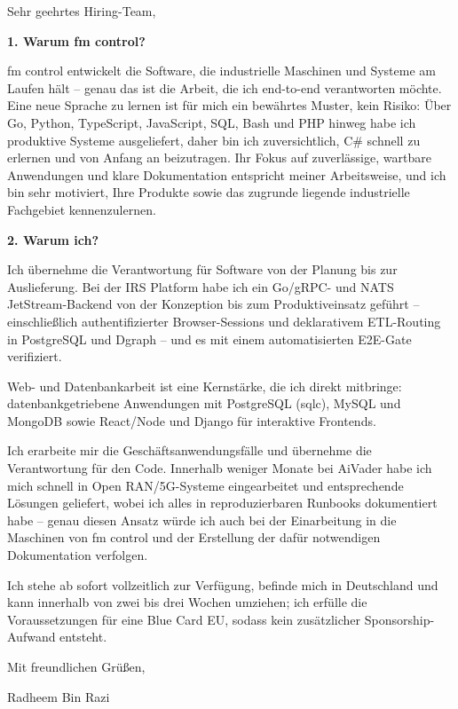 \documentclass[11pt,a4paper]{coverletter}
\begin{document}
\clearpage
{}


\opening{Sehr geehrtes Hiring-Team,}

\vspace{8pt}\noindent\textbf{1. Warum fm control?}\par\vspace{3pt}

fm control entwickelt die Software, die industrielle Maschinen und Systeme am Laufen hält – genau das ist die Arbeit, die ich end-to-end verantworten möchte. Eine neue Sprache zu lernen ist für mich ein bewährtes Muster, kein Risiko: Über Go, Python, TypeScript, JavaScript, SQL, Bash und PHP hinweg habe ich produktive Systeme ausgeliefert, daher bin ich zuversichtlich, C\# schnell zu erlernen und von Anfang an beizutragen. Ihr Fokus auf zuverlässige, wartbare Anwendungen und klare Dokumentation entspricht meiner Arbeitsweise, und ich bin sehr motiviert, Ihre Produkte sowie das zugrunde liegende industrielle Fachgebiet kennenzulernen.

\vspace{8pt}\noindent\textbf{2. Warum ich?}\par\vspace{3pt}

\bullets

  \item Ich übernehme die Verantwortung für Software von der Planung bis zur Auslieferung. Bei der IRS Platform habe ich ein Go/gRPC- und NATS JetStream-Backend von der Konzeption bis zum Produktiveinsatz geführt – einschließlich authentifizierter Browser-Sessions und deklarativem ETL-Routing in PostgreSQL und Dgraph – und es mit einem automatisierten E2E-Gate verifiziert.

  \item Web- und Datenbankarbeit ist eine Kernstärke, die ich direkt mitbringe: datenbankgetriebene Anwendungen mit PostgreSQL (sqlc), MySQL und MongoDB sowie React/Node und Django für interaktive Frontends.

  \item Ich erarbeite mir die Geschäftsanwendungsfälle und übernehme die Verantwortung für den Code. Innerhalb weniger Monate bei AiVader habe ich mich schnell in Open RAN/5G-Systeme eingearbeitet und entsprechende Lösungen geliefert, wobei ich alles in reproduzierbaren Runbooks dokumentiert habe – genau diesen Ansatz würde ich auch bei der Einarbeitung in die Maschinen von fm control und der Erstellung der dafür notwendigen Dokumentation verfolgen.

\bulletsend

Ich stehe ab sofort vollzeitlich zur Verfügung, befinde mich in Deutschland und kann innerhalb von zwei bis drei Wochen umziehen; ich erfülle die Voraussetzungen für eine Blue Card EU, sodass kein zusätzlicher Sponsorship-Aufwand entsteht.

\closing{Mit freundlichen Grüßen,}{Radheem Bin Razi}
\end{document}
